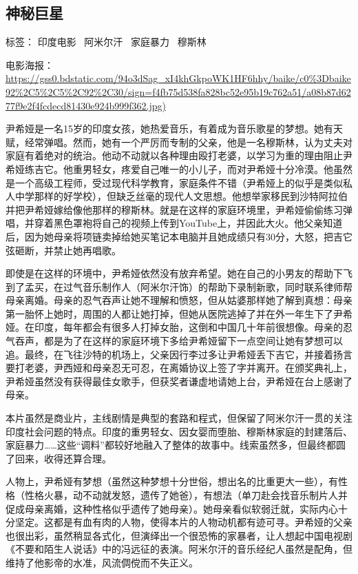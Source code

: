 \subsection{神秘巨星}

标签： 印度电影 \  阿米尔汗 \  家庭暴力 \  穆斯林 

电影海报：\url{https://gss0.bdstatic.com/94o3dSag_xI4khGkpoWK1HF6hhy/baike/c0\%3Dbaike92\%2C5\%2C5\%2C92\%2C30/sign=f4fb75d538fa828bc52e95b19c762a51/a08b87d6277f9e2f4fcdecd81430e924b999f362.jpg)}

尹希娅是一名15岁的印度女孩，她热爱音乐，有着成为音乐歌星的梦想。她有天赋，经常弹唱。然而，她有一个严厉而专制的父亲，他是一名穆斯林，认为丈夫对家庭有着绝对的统治。他动不动就以各种理由殴打老婆，以学习为重的理由阻止尹希娅练吉它。他重男轻女，疼爱自己唯一的小儿子，而对尹希娅十分冷漠。他虽然是一个高级工程师，受过现代科学教育，家庭条件不错（尹希娅上的似乎是类似私人中学那样的好学校），但缺乏丝毫的现代人文思想。他想举家移民到沙特阿拉伯并把尹希娅嫁给像他那样的穆斯林。就是在这样的家庭环境里，尹希娅偷偷练习弹唱，并穿着黑色罩袍将自己的视频上传到YouTube上，并因此大火。他父亲知道后，因为她母亲将项链卖掉给她买笔记本电脑并且她成绩只有30分，大怒，把吉它弦砸断，并禁止她再唱歌。

即使是在这样的环境中，尹希娅依然没有放弃希望。她在自己的小男友的帮助下飞到了孟买，在过气音乐制作人（阿米尔汗饰）的帮助下录制新歌，同时联系律师帮母亲离婚。母亲的忍气吞声让她不理解和愤怒，但从姑婆那样她了解到真想：母亲第一胎怀上她时，周围的人都让她打掉，但她从医院逃掉了并在外一年生下了尹希娅。在印度，每年都会有很多人打掉女胎，这倒和中国几十年前很想像。母亲的忍气吞声，都是为了在这样的家庭环境下多给尹希娅留下一点空间让她有梦想可以追。最终，在飞往沙特的机场上，父亲因行李过多让尹希娅丢下吉它，并接着扬言要打老婆，尹西娅和母亲忍无可忍，在离婚协议上签了字并离开。在颁奖典礼上，尹希娅虽然没有获得最佳女歌手，但获奖者谦虚地请她上台，尹希娅在台上感谢了母亲。

本片虽然是商业片，主线剧情是典型的套路和程式，但保留了阿米尔汗一贯的关注印度社会问题的特点。印度的重男轻女、因女婴而堕胎、穆斯林家庭的封建落后、家庭暴力……这些“调料”都较好地融入了整体的故事中。线索虽然多，但最终都圆了回来，收得还算合理。

人物上，尹希娅有梦想（虽然这种梦想十分世俗，想出名的比重更大一些），有性格（性格火暴，动不动就发怒，遗传了她爸），有想法（单刀赴会找音乐制片人并促成母亲离婚，这种性格似乎遗传了她母亲）。她母亲看似软弱迁就，实际内心十分坚定。这都是有血有肉的人物，使得本片的人物动机都有迹可寻。尹希娅的父亲也很出彩，虽然稍显各式化，但演绎出一个很恐怖的家暴者，让人想起中国电视剧《不要和陌生人说话》中的冯远征的表演。阿米尔汗的音乐经纪人虽然是配角，但维持了他影帝的水准，风流倜傥而不失正义。


